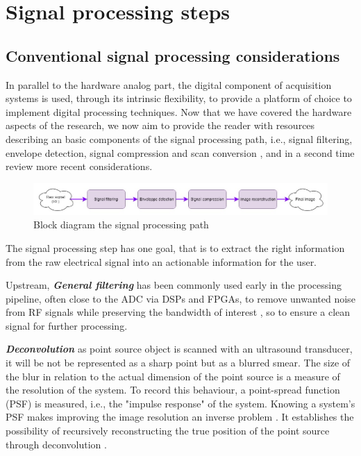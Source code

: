\documentclass{article}
\begin{document}
\newpage

\section{Signal processing steps}

\subsection{Conventional signal processing considerations}

In parallel to the hardware analog part, the digital component of acquisition systems is used, through its intrinsic flexibility, to provide a platform of choice to implement digital processing techniques. Now that we have covered the hardware aspects of the research, we now aim to provide the reader with resources describing an basic components of the signal processing path, i.e., signal filtering, envelope detection, signal compression and scan conversion \cite{basoglu_computing_1998}, and in a second time review more recent considerations.

\begin{figure}[H]
 \includegraphics[width=\linewidth]{Fig2.jpg}
 \caption{Block diagram the signal processing path}
 \label{fig:SigProc}
\end{figure}

The signal processing step has one goal, that is to extract the right information from the raw electrical signal into an actionable information for the user. 

Upstream, \textbf{\textit{General filtering}} has been commonly used early in the processing pipeline, often close to the ADC via DSPs and FPGAs, to remove unwanted noise from RF signals while preserving the bandwidth of interest \cite{assef_modeling_2019, levesque_real-time_2009}, so to ensure a clean signal for further processing.

\textbf{\textit{Deconvolution}} as point source object is scanned with an ultrasound transducer, it will be not be represented as a sharp point but as a blurred smear. The size of the blur in relation to the actual dimension of the point source is a measure of the resolution of the system. To record this behaviour, a point-spread function (PSF) is measured, i.e., the "impulse response" of the system.  Knowing a system’s PSF makes improving the image resolution an inverse problem  \cite{jensen_deconvolution_1993,dalitz_point_2015}. It establishes the possibility of recursively reconstructing the true position of the point source  through deconvolution \cite{dalitz_point_2015}.  
\end{document}
